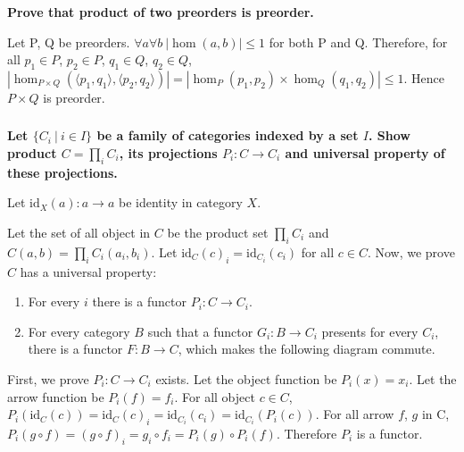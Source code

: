 \documentclass{article}
\begin{document}
\subsubsection{}

\textbf{Prove that product of two preorders is preorder.}

Let P, Q be preorders. $\forall a \forall b\ | \hom(a, b) | \leq 1$ for both P and Q. Therefore, for all $p_1 \in P$, $p_2 \in P$, $q_1 \in Q$, $q_2 \in Q$, $| \hom_{P \times Q}(\langle p_1, q_1 \rangle, \langle p_2, q_2 \rangle) | = | \hom_P(p_1, p_2) \times \hom_Q(q_1, q_2) | \leq 1$. Hence $P \times Q$ is preorder.

\subsubsection{}

\textbf{Let $\{C_i\ |\ i \in I\}$ be a family of categories indexed by a set $I$. Show product $C = \prod_i C_i$, its projections $P_i : C \rightarrow C_i$ and universal property of these projections.}

Let $\mathrm{id}_X(a) : a \rightarrow a$ be identity in category $X$.

Let the set of all object in $C$ be the product set $\prod_i C_i$ and $C(a, b) = \prod_i C_i(a_i, b_i)$. Let $\mathrm{id}_C(c)_i = \mathrm{id}_{C_i}(c_i)$ for all $c \in C$. Now, we prove $C$ has a universal property:

\begin{enumerate}
\item For every $i$ there is a functor $P_i : C \rightarrow C_i$.
\item For every category $B$ such that a functor $G_i : B \rightarrow C_i$ presents for every $C_i$, there is a functor $F : B \rightarrow C$, which makes the following diagram commute.

\begin{center}
\end{center}
\end{enumerate}

First, we prove $P_i : C \rightarrow C_i$ exists. Let the object function be $P_i(x) = x_i$. Let the arrow function be $P_i(f) = f_i$. For all object $c \in C$, $P_i(\mathrm{id}_C(c)) = \mathrm{id}_C(c)_i = \mathrm{id}_{C_i}(c_i) = \mathrm{id}_{C_i}(P_i(c))$. For all arrow $f$, $g$ in C, $P_i(g \circ f) = (g \circ f)_i = g_i \circ f_i =  P_i(g) \circ P_i(f)$. Therefore $P_i$ is a functor.
\end{document}
